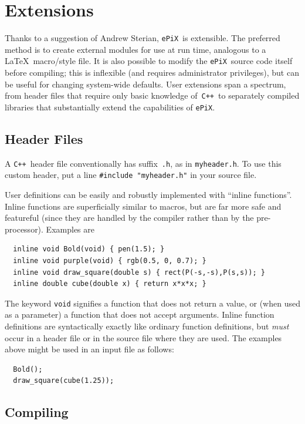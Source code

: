 \documentclass[12pt]{report}
\newcommand{\code}[1]{\texttt{#1}}
\newcommand{\filename}[1]{\texttt{#1}}
\newcommand{\ePiX}{\code{ePiX}}
\newcommand{\CXX}{\code{C++}}
\begin{document}
\section{Extensions}

Thanks to a suggestion of Andrew Sterian, \ePiX\ is extensible. The
preferred method is to create external modules for use at run time,
analogous to a \LaTeX\ macro/style file. It is also possible to modify
the \ePiX\ source code itself before compiling; this is inflexible
(and requires administrator privileges), but can be useful for
changing system-wide defaults.  User extensions span a spectrum, from
header files that require only basic knowledge of~\CXX\ to separately
compiled libraries that substantially extend the capabilities of
\ePiX.


\subsection*{Header Files}

A \CXX~header file conventionally has suffix~\filename{.h}, as in
\filename{myheader.h}. To use this custom header, put a line
\code{\#include "myheader.h"} in your source file.

User definitions can be easily and robustly implemented with ``inline
functions''. Inline functions are superficially similar to macros, but
are far more safe and featureful (since they are handled by the
compiler rather than by the pre-processor).  Examples are
\begin{verbatim}
  inline void Bold(void) { pen(1.5); }
  inline void purple(void) { rgb(0.5, 0, 0.7); }
  inline void draw_square(double s) { rect(P(-s,-s),P(s,s)); }
  inline double cube(double x) { return x*x*x; }
\end{verbatim}
The keyword \code{void} signifies a function that does not return a
value, or (when used as a parameter) a function that does not accept
arguments. Inline function definitions are syntactically exactly like
ordinary function definitions, but \emph{must} occur in a header file
or in the source file where they are used. The examples above might be
used in an input file as follows:
\begin{verbatim}
  Bold();  
  draw_square(cube(1.25));
\end{verbatim}



\subsection*{Compiling}
\end{document}
